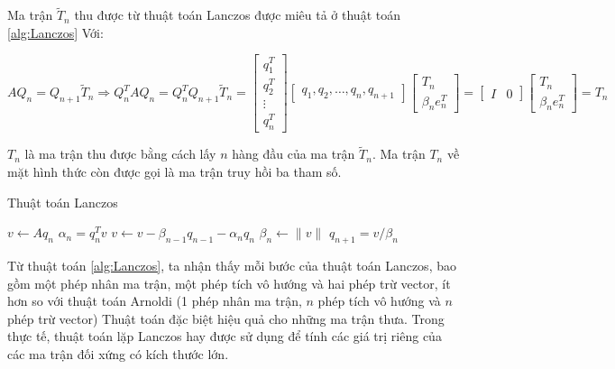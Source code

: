 \documentclass[14pt, a4paper]{article}
\numberwithin{equation}{section}
\numberwithin{algorithm}{section}
\numberwithin{figure}{section}
\numberwithin{dl}{section}
\numberwithin{md}{section}
\numberwithin{bd}{section}
\begin{document}
Ma trận $\widetilde{T}_n$ thu được từ thuật toán Lanczos được miêu tả ở thuật toán \ref{alg:Lanczos}
Với:

\begin{equation}
    AQ_n = Q_{n+1}\widetilde{T}_n \Rightarrow Q_n^TAQ_n = Q_n^TQ_{n+1}\widetilde{T}_n=\begin{bmatrix}
        q_1^T \\ q_2^T \\ \vdots \\ q_n^T
    \end{bmatrix} \begin{bmatrix} q_1, q_2, \dots, q_n, q_{n+1} \end{bmatrix}\begin{bmatrix}
        T_n \\ \beta_n e_n^T
    \end{bmatrix}=\begin{bmatrix}
        I & 0
    \end{bmatrix} \begin{bmatrix}
        T_n \\ \beta_n e_n^T
    \end{bmatrix}=T_n
\end{equation}

$T_n$ là ma trận thu được bằng cách lấy $n$ hàng đầu của ma trận $\widetilde{T}_n$. 
Ma trận $T_n$ về mặt hình thức còn được gọi là ma trận truy hồi ba tham số.

\begin{algorithm}
    \caption{Thuật toán Lanczos}\label{alg:Lanczos}
    \begin{algorithmic}
            \State $v \leftarrow Aq_n$
            \State $\alpha_n=q_n^Tv$
            \State $v \leftarrow v - \beta_{n-1}q_{n-1} - \alpha_n q_n$
            \State $\beta_n \leftarrow \lVert v \rVert$
            \State $q_{n+1}=v/\beta_n$
        \EndFor
    \end{algorithmic}
\end{algorithm}

Từ thuật toán \ref{alg:Lanczos}, ta nhận thấy mỗi bước của thuật toán Lanczos, bao gồm một phép nhân ma trận, một phép tích vô hướng và hai phép trừ vector, ít hơn so với thuật toán Arnoldi (1 phép nhân ma trận, $n$ phép tích vô hướng và $n$ phép trừ vector)
Thuật toán đặc biệt hiệu quả cho những ma trận thưa. Trong thực tế, thuật toán lặp Lanczos hay được sử dụng để tính các giá trị riêng của các ma trận đối xứng có kích thước lớn.
\end{document}
